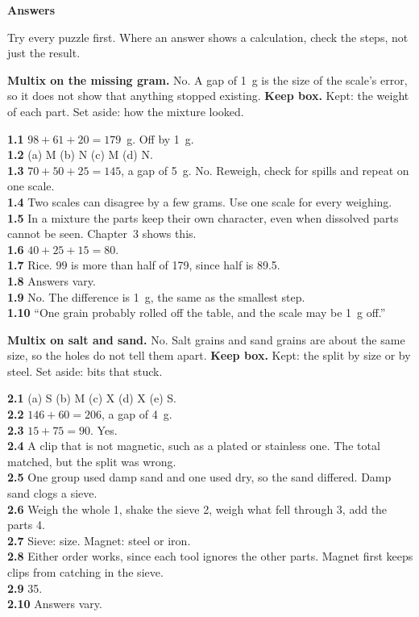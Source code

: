 \clearpage\label{answers}
{\sans\bfseries\LARGE\color{ink} Answers}\par
\footnotesize\linespread{0.94}\selectfont
Try every puzzle first. Where an answer shows a calculation, check the steps, not just the result.

\textbf{Multix on the missing gram.} No. A gap of 1~g is the size of the scale's error, so it does not show that anything stopped existing. \textbf{Keep box.} Kept: the weight of each part. Set aside: how the mixture looked.

\textbf{1.1} $98+61+20=179$~g. Off by 1~g.\\
\textbf{1.2} (a) M (b) N (c) M (d) N.\\
\textbf{1.3} $70+50+25=145$, a gap of 5~g. No. Reweigh, check for spills and repeat on one scale.\\
\textbf{1.4} Two scales can disagree by a few grams. Use one scale for every weighing.\\
\textbf{1.5} In a mixture the parts keep their own character, even when dissolved parts cannot be seen. Chapter~3 shows this.\\
\textbf{1.6} $40+25+15=80$.\\
\textbf{1.7} Rice. $99$ is more than half of 179, since half is 89.5.\\
\textbf{1.8} Answers vary.\\
\textbf{1.9} No. The difference is 1~g, the same as the smallest step.\\
\textbf{1.10} ``One grain probably rolled off the table, and the scale may be 1~g off.''

\textbf{Multix on salt and sand.} No. Salt grains and sand grains are about the same size, so the holes do not tell them apart. \textbf{Keep box.} Kept: the split by size or by steel. Set aside: bits that stuck.

\textbf{2.1} (a) S (b) M (c) X (d) X (e) S.\\
\textbf{2.2} $146+60=206$, a gap of 4~g.\\
\textbf{2.3} $15+75=90$. Yes.\\
\textbf{2.4} A clip that is not magnetic, such as a plated or stainless one. The total matched, but the split was wrong.\\
\textbf{2.5} One group used damp sand and one used dry, so the sand differed. Damp sand clogs a sieve.\\
\textbf{2.6} Weigh the whole 1, shake the sieve 2, weigh what fell through 3, add the parts 4.\\
\textbf{2.7} Sieve: size. Magnet: steel or iron.\\
\textbf{2.8} Either order works, since each tool ignores the other parts. Magnet first keeps clips from catching in the sieve.\\
\textbf{2.9} 35.\\
\textbf{2.10} Answers vary.

